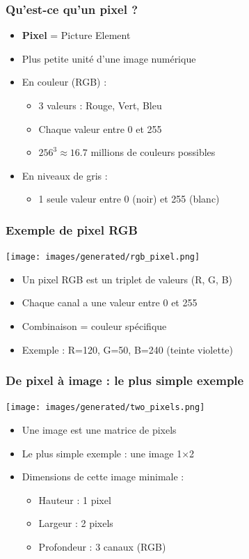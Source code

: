 \documentclass{beamer}
\begin{document}
\begin{frame}
    \frametitle{Qu'est-ce qu'un pixel ?}
    \begin{itemize}
        \item \textbf{Pixel} = Picture Element
        \item Plus petite unité d'une image numérique
        \item En couleur (RGB) :
        \begin{itemize}
            \item 3 valeurs : Rouge, Vert, Bleu
            \item Chaque valeur entre 0 et 255
            \item \(256^3 \approx 16.7\) millions de couleurs possibles
        \end{itemize}
        \item En niveaux de gris :
        \begin{itemize}
            \item 1 seule valeur entre 0 (noir) et 255 (blanc)
        \end{itemize}
    \end{itemize}
\end{frame}

\begin{frame}
    \frametitle{Exemple de pixel RGB}
    \begin{center}
        \texttt{[image: images/generated/rgb\_pixel.png]}
    \end{center}
    \begin{itemize}
        \item Un pixel RGB est un triplet de valeurs (R, G, B)
        \item Chaque canal a une valeur entre 0 et 255
        \item Combinaison = couleur spécifique
        \item Exemple : R=120, G=50, B=240 (teinte violette)
    \end{itemize}
\end{frame}

\begin{frame}
    \frametitle{De pixel à image : le plus simple exemple}
    \begin{center}
        \texttt{[image: images/generated/two\_pixels.png]}
    \end{center}
    \begin{itemize}
        \item Une image est une matrice de pixels
        \item Le plus simple exemple : une image 1×2
        \item Dimensions de cette image minimale :
        \begin{itemize}
            \item Hauteur : 1 pixel
            \item Largeur : 2 pixels
            \item Profondeur : 3 canaux (RGB)
        \end{itemize}
    \end{itemize}
\end{frame}
\end{document}
